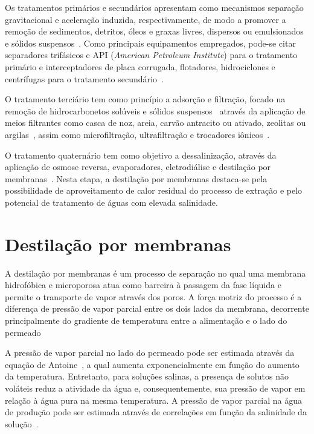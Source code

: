 Os tratamentos primários e secundários apresentam como mecanismos separação gravitacional e aceleração induzida, respectivamente, de modo a promover a remoção de sedimentos, detritos, óleos e graxas livres, dispersos ou emulsionados e sólidos suspensos~\cite{Devold2013,Hoek2021}. Como principais equipamentos empregados, pode-se citar separadores trifásicos e API (\textit{American Petroleum Institute}) para o tratamento primário e interceptadores de placa corrugada, flotadores, hidrociclones e centrífugas para o tratamento secundário~\cite{FakhrulRazi2009,Amakiri2022}.

O tratamento terciário tem como princípio a adsorção e filtração, focado na remoção de hidrocarbonetos solúveis e sólidos suspensos~\cite{Amakiri2022,Hoek2021} através da aplicação de meios filtrantes como casca de noz, areia, carvão antracito ou ativado, zeolitas ou argilas~\cite{Hoek2021,Ibrahim2023}, assim como microfiltração, ultrafiltração e trocadores iônicos~\cite{Igunnu2014,Hoek2021}.

O tratamento quaternário tem como objetivo a dessalinização, através da aplicação de osmose reversa, evaporadores, eletrodiálise e destilação por membranas~\cite{FakhrulRazi2009,Igunnu2014,Ibrahim2023}. Nesta etapa, a destilação por membranas destaca-se pela possibilidade de aproveitamento de calor residual do processo de extração e pelo potencial de tratamento de águas com elevada salinidade.

\section{Destilação por membranas}


A destilação por membranas é um processo de separação no qual uma membrana hidrofóbica e microporosa atua como barreira à passagem da fase líquida e permite o transporte de vapor através dos poros. A força motriz do processo é a diferença de pressão de vapor parcial entre os dois lados da membrana, decorrente principalmente do gradiente de temperatura entre a alimentação e o lado do permeado~\cite{Parani2021,Olatunji2018MDModeling}

A pressão de vapor parcial no lado do permeado pode ser estimada através da equação de Antoine~\cite{wisniak2001historical}, a qual aumenta exponencialmente em função do aumento da temperatura. Entretanto, para soluções salinas, a presença de solutos não voláteis reduz a atividade da água e, consequentemente, sua pressão de vapor em relação à água pura na mesma temperatura. A pressão de vapor parcial na água de produção pode ser estimada através de correlações em função da salinidade da solução~\cite{Nayar2016,Olatunji2018MDModeling}.

